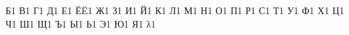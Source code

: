 {          {Б}{{\selectfont{}}}1
          {В}{{\selectfont{}}}1
          {Г}{{\selectfont{}}}1
          {Д}{{\selectfont{}}}1
          {Е}{{\selectfont{}}}1
          {Ё}{{\"E}}1
          {Ж}{{\selectfont{}}}1
          {З}{{\selectfont{}}}1
          {И}{{\selectfont{}}}1
          {Й}{{\selectfont{}}}1
          {К}{{\selectfont{}}}1
          {Л}{{\selectfont{}}}1
          {М}{{\selectfont{}}}1
          {Н}{{\selectfont{}}}1
          {О}{{\selectfont{}}}1
          {П}{{\selectfont{}}}1
          {Р}{{\selectfont{}}}1
          {С}{{\selectfont{}}}1
          {Т}{{\selectfont{}}}1
          {У}{{\selectfont{}}}1
          {Ф}{{\selectfont{}}}1
          {Х}{{\selectfont{}}}1
          {Ц}{{\selectfont{}}}1
          {Ч}{{\selectfont{}}}1
          {Ш}{{\selectfont{}}}1
          {Щ}{{\selectfont{}}}1
          {Ъ}{{\selectfont{}}}1
          {Ы}{{\selectfont{}}}1
          {Ь}{{\selectfont{}}}1
          {Э}{{\selectfont{}}}1
          {Ю}{{\selectfont{}}}1
          {Я}{{\selectfont{}}}1
          {λ}{{\selectfont{}}}1
 }
